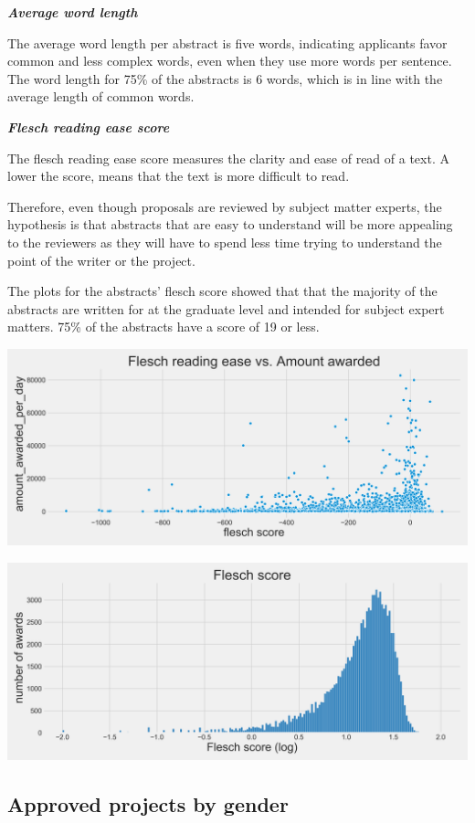 \documentclass[11pt, oneside]{article}   	%
\begin{document}
\textbf{\emph{Average word length}}

The average word length per abstract is five words, indicating applicants favor common and less complex words, even when they use more words per sentence. The word length for 75\% of the abstracts is 6 words, which is in line with the average length of common words.

\textbf{\emph{Flesch reading ease score}}

The flesch reading ease score measures the clarity and ease of read of a text. A lower the score, means that the text is more difficult to read.

Therefore, even though proposals are reviewed by subject matter experts, the hypothesis is that abstracts that are easy to understand will be more appealing to the reviewers as they will have to spend less time trying to understand the point of the writer or the project. 

The plots for the abstracts' flesch score showed that that the majority of the abstracts are written for at the graduate level and intended for subject expert matters. 75\% of the abstracts have a score of 19 or less.

\includegraphics[width=\textwidth]{fleschscore}

 \includegraphics[width=\textwidth]{fleschscorehist}
 
 \subsection{Approved projects by gender} 
 
\end{document}
